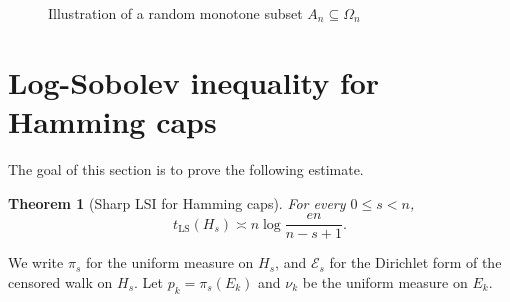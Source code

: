 \documentclass[12pt,final]{amsart}
\newcommand{\1}{\mathbf{1}}
\newtheorem{theorem}{Theorem}[section]
\newcommand{\Ecal}{\mathcal{E}}
\begin{document}
\begin{figure}[H]
\caption{Illustration of a random monotone subset $A_n\subseteq \Omega_n$}
\label{fig:RandomMonotoneSet}
\end{figure}





\section{Log-Sobolev inequality for Hamming caps}\label{sec:LSI-caps}

The goal of this section is to prove the following estimate. 

\begin{theorem}[Sharp LSI for Hamming caps]\label{thm:hamming-caps}
For every $0\leq s< n$, 
\[
 t_{\operatorname{LS}}(H_s)  \asymp
        n\log\frac{en}{n-s+1}.
\]
\end{theorem}

We write $\pi_s$ for the uniform measure on $H_s$, and $\Ecal_s$ for the Dirichlet form of the censored walk on $H_s$. Let $p_k=\pi_s(E_k)$ and $\nu_k$ be the uniform measure on $E_k$. 
\end{document}
